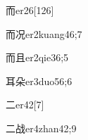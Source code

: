 \begin{verbete}{而}{er2}{6}[126]
\end{verbete}

\begin{verbete}{而况}{er2kuang4}{6;7}
\end{verbete}

\begin{verbete}{而且}{er2qie3}{6;5}
\end{verbete}

\begin{verbete}{耳朵}{er3duo5}{6;6}
\end{verbete}

\begin{verbete}{二}{er4}{2}[7]
\end{verbete}

\begin{verbete}{二战}{er4zhan4}{2;9}
\end{verbete}

